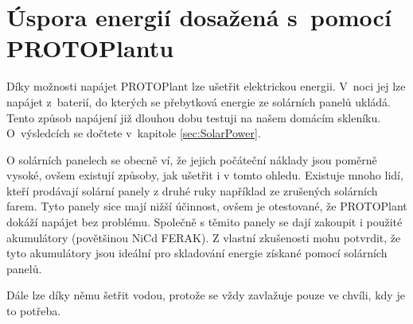 \chapter{Úspora energií dosažená s~pomocí PROTOPlantu}
Díky možnosti napájet PROTOPlant  lze ušetřit elektrickou energii. 
V~noci jej lze napájet z~baterií, do kterých se přebytková energie ze solárních panelů ukládá.
Tento způsob napájení již dlouhou dobu testuji na našem domácím skleníku. 
O~výsledcích se dočtete v~kapitole \ref{sec:SolarPower}.

O solárních panelech se obecně ví, že jejich počáteční náklady jsou poměrně vysoké, ovšem existují způsoby, jak ušetřit i v tomto ohledu.
Existuje mnoho lidí, kteří prodávají solární panely z druhé ruky například ze zrušených solárních farem.
Tyto panely sice mají nižší účinnost, ovšem je otestované, že PROTOPlant dokáží napájet bez problému.
Společně s těmito panely se dají zakoupit i použité akumulátory (povětšinou NiCd FERAK).
Z vlastní zkušenosti mohu potvrdit, že tyto akumulátory jsou ideální pro skladování energie získané pomocí solárních panelů.

Dále lze díky němu šetřit vodou, protože se vždy zavlažuje pouze ve chvíli, kdy je to potřeba.

\newpage